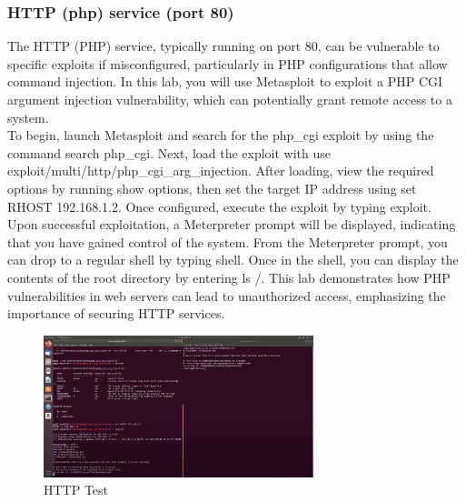 \documentclass[a4paper,11pt]{article} %
\begin{document}
\subsubsection{HTTP (php) service (port 80)}
The HTTP (PHP) service, typically running on port 80, can be vulnerable to specific exploits if misconfigured, particularly in PHP configurations that allow command injection. In this lab, you will use Metasploit to exploit a PHP CGI argument injection vulnerability, which can potentially grant remote access to a system.\\
To begin, launch Metasploit and search for the php\_cgi exploit by using the command search php\_cgi. Next, load the exploit with use exploit/multi/http/php\_cgi\_arg\_injection. After loading, view the required options by running show options, then set the target IP address using set RHOST 192.168.1.2. Once configured, execute the exploit by typing exploit.\\
Upon successful exploitation, a Meterpreter prompt will be displayed, indicating that you have gained control of the system. From the Meterpreter prompt, you can drop to a regular shell by typing shell. Once in the shell, you can display the contents of the root directory by entering ls /. This lab demonstrates how PHP vulnerabilities in web servers can lead to unauthorized access, emphasizing the importance of securing HTTP services. 

\break

\begin{figure}[h!]
    \centering
    \includegraphics[width=0.7\textwidth]{images/13.png}
    \caption{HTTP Test}
\end{figure}
\end{document}

